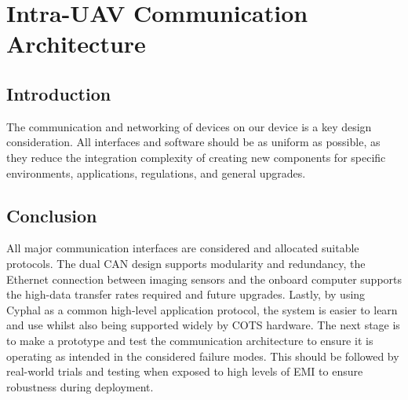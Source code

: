 \newpage
{}
\section{Intra-UAV Communication Architecture} \label{Intra Communication}

\subsection{Introduction}\label{sub_section:tgt_intra_com_intro}
The communication and networking of devices on our device is a key design consideration. All interfaces and software should be as uniform as possible, as they reduce the integration complexity of creating new components for specific environments, applications, regulations, and general upgrades.



\subsection{Conclusion}
All major communication interfaces are considered and allocated suitable protocols. The dual \gls{CAN} design supports modularity and redundancy, the Ethernet connection between imaging sensors and the onboard computer supports the high-data transfer rates required and future upgrades. Lastly, by using Cyphal as a common high-level application protocol, the system is easier to learn and use whilst also being supported widely by \gls{COTS} hardware. The next stage is to make a prototype and test the communication architecture to ensure it is operating as intended in the considered failure modes. This should be followed by real-world trials and testing when exposed to high levels of \gls{EMI} to ensure robustness during deployment.